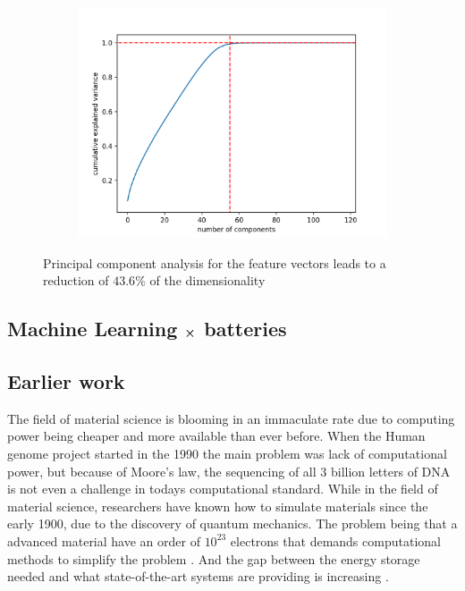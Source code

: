 \begin{figure}[H]
    \centering
    \begin{subfigure}{0.48\textwidth}
        \centering
        \includegraphics[width=\linewidth]{theory/figures/PCA_reduction_of_dimensionality.png}
    \end{subfigure}%
	\caption{Principal component analysis for the feature vectors leads to a reduction of $43.6\%$ of the dimensionality}
	\label{fig:PCA_dim}
\end{figure}



\subsection{Machine Learning $\cross$ batteries}


\subsection{Earlier work}

The field of material science is blooming in an immaculate rate due to computing power being cheaper and more available than ever before. When the Human genome project started in the 1990 the main problem was lack of computational power, but because of Moore's law, the sequencing of all 3 billion letters of DNA is not even a challenge in todays computational standard. While in the field of material science, researchers have known how to simulate materials since the early 1900, due to the discovery of quantum mechanics. The problem being that a advanced material have an order of $10^{23}$ electrons that demands computational methods to simplify the problem \cite{electromaterials}. And the gap between the energy storage needed and what state-of-the-art systems are providing is increasing \cite{reddy2011linden}.



